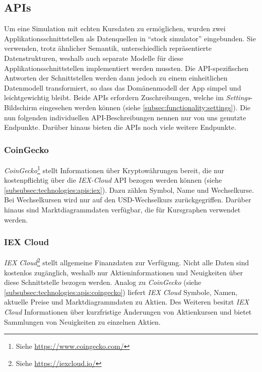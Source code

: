 \documentclass[a4paper]{article}
\begin{document}
\subsection{APIs}
\label{subsec:technologies:apis}
Um eine Simulation mit echten Kursdaten zu ermöglichen, wurden zwei Applikationsschnittstellen als Datenquellen in "`stock simulator"' eingebunden.
Sie verwenden, trotz ähnlicher Semantik, unterschiedlich repräsentierte Datenstrukturen, weshalb auch separate Modelle für diese Applikationsschnittstellen implementiert werden mussten.
Die API-spezifischen Antworten der Schnittstellen werden dann jedoch zu einem einheitlichen Datenmodell transformiert, so dass das Domänenmodell der App simpel und leichtgewichtig bleibt.
Beide APIs erfordern Zuschreibungen, welche im \textit{Settings}-Bildschirm eingesehen werden können (siehe \autoref{subsec:functionality:settings}).
Die nun folgenden individuellen API-Beschreibungen nennen nur von uns genutzte Endpunkte.
Darüber hinaus bieten die APIs noch viele weitere Endpunkte.


\subsubsection{CoinGecko}
\label{subsubsec:technologies:apis:coingecko}
\textit{CoinGecko}\footnote{Siehe \url{https://www.coingecko.com/}} stellt Informationen über Kryptowährungen bereit, die nur kostenpflichtig über die \textit{IEX-Cloud} API bezogen werden können (siehe \autoref{subsubsec:technologies:apis:iex}).
Dazu zählen Symbol, Name und Wechselkurse.
Bei Wechselkursen wird nur auf den USD-Wechselkurs zurückgegriffen.
Darüber hinaus sind Marktdiagrammdaten verfügbar, die für Kursgraphen verwendet werden.


\subsubsection{IEX Cloud}
\label{subsubsec:technologies:apis:iex}
\textit{IEX Cloud}\footnote{Siehe \url{https://iexcloud.io/}} stellt allgemeine Finanzdaten zur Verfügung.
Nicht alle Daten sind kostenlos zugänglich, weshalb nur Aktieninformationen und Neuigkeiten über diese Schnittstelle bezogen werden.
Analog zu \textit{CoinGecko} (siehe \autoref{subsubsec:technologies:apis:coingecko}) liefert \textit{IEX Cloud} Symbole, Namen, aktuelle Preise und Marktdiagrammdaten zu Aktien.
Des Weiteren besitzt \textit{IEX Cloud} Informationen über kurzfristige Änderungen von Aktienkursen und bietet Sammlungen von Neuigkeiten zu einzelnen Aktien.
\end{document}
